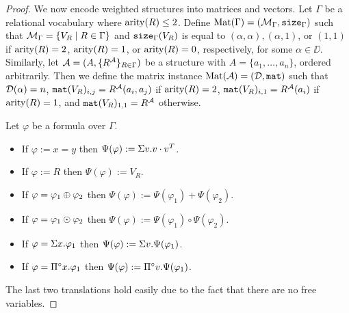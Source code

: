 \begin{proof}
We now encode weighted structures into matrices and vectors. Let $\Gamma$ be a relational vocabulary 
where $\operatorname{arity}(R) \leq 2$. 
Define $\text{Mat}(\Gamma) = (\mathcal{M}_\Gamma,\texttt{size}_\Gamma)$ such 
that $\mathcal{M}_\Gamma = \{ V_{R} \mid R \in \Gamma\}$ and $\texttt{size}_\Gamma(V_{R})$ is equal to 
$(\alpha, \alpha), (\alpha, 1)$, or $(1,1)$ if $\operatorname{arity}(R)=2$, $\operatorname{arity}(R)=1$, or $\operatorname{arity}(R)=0$, 
respectively, for some $\alpha \in \DD$. Similarly, let $\mathcal{A} = (A, \{R^{\mathcal{A}}\}_{R \in \Gamma})$ 
be a structure with $A = \{a_1, \ldots, a_n\}$, ordered arbitrarily.
Then we define the matrix instance $\text{Mat}(\mathcal{A}) = (\mathcal{D},\texttt{mat})$ such that $\mathcal{D}(\alpha) = n$, 
$\texttt{mat}(V_{R})_{i,j} = R^{\mathcal{A}}(a_i, a_j)$ if $\operatorname{arity}(R)=2$, $\texttt{mat}(V_{R})_{i,1} = R^{\mathcal{A}}(a_i)$ if $\operatorname{arity}(R)=1$, 
and $\texttt{mat}(V_{R})_{1,1} = R^{\mathcal{A}}$ otherwise.

Let $\varphi$ be a formula over $\Gamma$.
\begin{itemize}
  \item If $\varphi:=x=y$ then $\Psi(\varphi):= \Sigma v.v\cdot v^T$.
  \item If $\varphi:=R$ then $\Psi(\varphi):=V_R$.
  \item If $\varphi = \varphi_1 \oplus \varphi_2$ then $\Psi(\varphi):=\Psi(\varphi_1) + \Psi(\varphi_2)$.
  \item If $\varphi = \varphi_1 \odot \varphi_2$ then $\Psi(\varphi):=\Psi(\varphi_1) \circ \Psi(\varphi_2)$.
  \item If $\varphi = \Sigma x. \varphi_1$ then $\Psi(\varphi):=\Sigma v.\Psi(\varphi_1)$.
  \item If $\varphi = \Pi^{\circ} x. \varphi_1$ then $\Psi(\varphi):=\Pi^{\circ} v.\Psi(\varphi_1)$.
\end{itemize}

The last two translations hold easily due to the fact that there are no free variables.

\end{proof}
